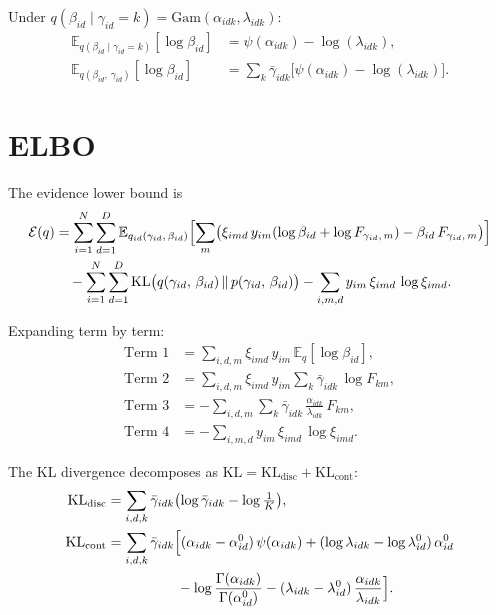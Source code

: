 \documentclass[11pt]{article}
\newcommand{\Gam}{\mathrm{Gam}}
\newcommand{\KL}{\mathrm{KL}}
\newcommand{\E}{\mathbb{E}}
\newcommand{\gb}{\bar{\gamma}}
\theoremstyle{definition}
\begin{document}
Under $q(\beta_{id} \mid \gamma_{id} = k) = \Gam(\alpha_{idk}, \lambda_{idk})$:
\begin{align}
  \E_{q(\beta_{id} \mid \gamma_{id}=k)}[\log \beta_{id}] &= \psi(\alpha_{idk}) - \log(\lambda_{idk}), \label{eq:Elogbeta_cond} \\
  \E_{q(\beta_{id},\, \gamma_{id})}[\log \beta_{id}] &= \sum_k \gb_{idk}\bigl[\psi(\alpha_{idk}) - \log(\lambda_{idk})\bigr]. \label{eq:Elogbeta}
\end{align}

\section{ELBO}

The evidence lower bound is
\begin{align}
  \mathcal{E}(q) &= \sum_{i=1}^{N} \sum_{d=1}^{D} \E_{q_{id}(\gamma_{id},\, \beta_{id})} \Bigl[\sum_m \bigl(\xi_{imd}\, y_{im}(\log \beta_{id} + \log F_{\gamma_{id},\, m}) - \beta_{id}\, F_{\gamma_{id},\, m}\bigr)\Bigr] \nonumber \\
  &\quad - \sum_{i=1}^{N} \sum_{d=1}^{D} \KL\bigl(q(\gamma_{id},\, \beta_{id}) \,\|\, p(\gamma_{id},\, \beta_{id})\bigr) - \sum_{i,m,d} y_{im}\, \xi_{imd}\, \log \xi_{imd}. \label{eq:ELBO}
\end{align}

Expanding term by term:
\begin{align}
  \text{Term 1} &= \sum_{i,d,m} \xi_{imd}\, y_{im}\, \E_q[\log \beta_{id}], \\
  \text{Term 2} &= \sum_{i,d,m} \xi_{imd}\, y_{im} \sum_k \gb_{idk}\, \log F_{km}, \\
  \text{Term 3} &= -\sum_{i,d,m} \sum_k \gb_{idk}\, \frac{\alpha_{idk}}{\lambda_{idk}}\, F_{km}, \\
  \text{Term 4} &= -\sum_{i,m,d} y_{im}\, \xi_{imd}\, \log \xi_{imd}.
\end{align}

The KL divergence decomposes as $\KL = \KL_{\text{disc}} + \KL_{\text{cont}}$:
\begin{align}
  \KL_{\text{disc}} &= \sum_{i,d,k} \gb_{idk}\bigl(\log \gb_{idk} - \log \tfrac{1}{K}\bigr), \label{eq:KL_disc} \\
  \KL_{\text{cont}} &= \sum_{i,d,k} \gb_{idk} \Bigl[
    (\alpha_{idk} - \alpha_{id}^0)\,\psi(\alpha_{idk})
    + (\log \lambda_{idk} - \log \lambda_{id}^0)\,\alpha_{id}^0 \nonumber \\
    &\qquad\qquad\quad - \log\frac{\Gamma(\alpha_{idk})}{\Gamma(\alpha_{id}^0)}
    - (\lambda_{idk} - \lambda_{id}^0)\,\frac{\alpha_{idk}}{\lambda_{idk}}
  \Bigr]. \label{eq:KL_cont}
\end{align}
\end{document}
